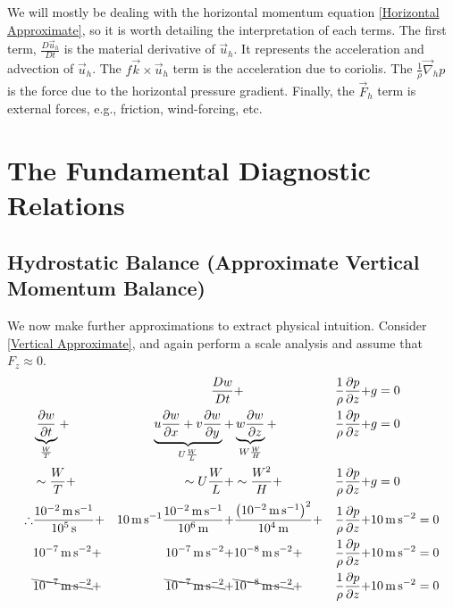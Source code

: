 We will mostly be dealing with the horizontal momentum equation \ref{Horizontal Approximate}, so it is worth detailing the interpretation of each terms. The first term, \(\frac{D\vec{u}_h}{Dt}\) is the material derivative of \(\vec{u}_h\). It represents the acceleration and advection of \(\vec{u}_h\). The \(f\vec{k}\times\vec{u}_h\) term is the acceleration due to coriolis. The \(\frac{1}{\rho}\vec{\nabla}_h p\) is the force due to the horizontal pressure gradient. Finally, the \(\vec{F}_h\) term is external forces, e.g., friction, wind-forcing, etc.

\chapter{The Fundamental Diagnostic Relations}\label{Dia Relations}

\section{Hydrostatic Balance (Approximate Vertical Momentum Balance)}\label{App Vert Bal}

We now make further approximations to extract physical intuition. Consider \ref{Vertical Approximate}, and again perform a scale analysis and assume that \(F_z\approx 0\).
\begin{align*}
    &&\frac{Dw}{Dt} &+
    & \frac{1}{\rho}\frac{\partial p}{\partial z}+
    &g=0
    \\
    &\underbrace{\frac{\partial w}{\partial t}}_{\frac{W}{T}}+ 
    &\underbrace{u\frac{\partial w}{\partial x} 
    + v\frac{\partial w}{\partial y}}_{U\frac{W}{L}}+ 
    &\underbrace{w\frac{\partial w}{\partial z}}_{W\frac{W}{H}}+ 
    &\frac{1}{\rho}\frac{\partial p}{\partial z}+
    &g=0
    \\
    &\sim\frac{W}{T}+
    &\sim U\frac{W}{L}+
    &\sim\frac{W^2}{H}+ 
    &\frac{1}{\rho}\frac{\partial p}{\partial z}+
    &g=0
    \\
    \therefore
    &\frac{\text{\qty{e-2}{\metre\per\second}}}{\text{\qty{e5}{\second}}}+ 
    &\text{\qty{10}{\metre\per\second}}\frac{\text{\qty{e-2}{\metre\per\second}}}{\text{\qty{e6}{\metre}}}+ 
    &\frac{\left( \text{\qty{e-2}{\metre\per\second}} \right)^2}{\text{\qty{e4}{\metre}}}+ 
    &\frac{1}{\rho}\frac{\partial p}{\partial z}+
    &\text{\qty{10}{\metre\per\second\squared}}=0
    \\
    &\text{\qty{e-7}{\metre\per\second\squared}}+
    &\text{\qty{e-7}{\metre\per\second\squared}}+
    &\text{\qty{e-8}{\metre\per\second\squared}}+
    &\frac{1}{\rho}\frac{\partial p}{\partial z}+
    &\text{\qty{10}{\metre\per\second\squared}}=0
    \\
    &\bcancel{\text{\qty{e-7}{\metre\per\second\squared}}}+
    &\bcancel{\text{\qty{e-7}{\metre\per\second\squared}}}+
    &\bcancel{\text{\qty{e-8}{\metre\per\second\squared}}}+
    &\frac{1}{\rho}\frac{\partial p}{\partial z}+
    &\text{\qty{10}{\metre\per\second\squared}}=0
\end{align*}


